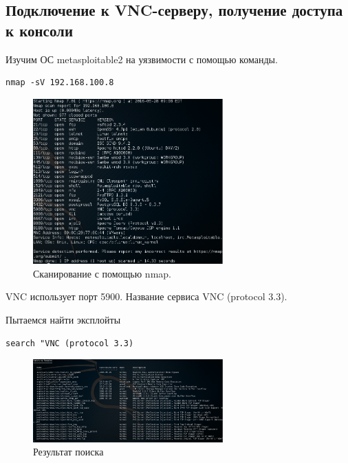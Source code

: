 \documentclass[10pt,a4paper]{article}
\begin{document}
\subsection{Подключение к VNC-серверу, получение доступа к консоли}
Изучим ОС metasploitable2 на уязвимости с помощью команды.\\
\begin{verbatim}
nmap -sV 192.168.100.8
\end{verbatim}

\begin{figure}[h!]
\begin{center}
\includegraphics[width=0.65\textwidth]{nmap_scan}
\caption{Сканирование с помощью nmap.}
\label{fig:nmap}
\end{center}
\end{figure}

VNC использует порт 5900. Название сервиса VNC (protocol 3.3).

Пытаемся найти эксплойты
\begin{verbatim}
search "VNC (protocol 3.3)
\end{verbatim}

\begin{figure}[h!]
\begin{center}
\includegraphics[width=0.65\textwidth]{search_vnc}
\caption{Результат поиска}
\label{fig:search_vnc}
\end{center}
\end{figure}
\end{document}
